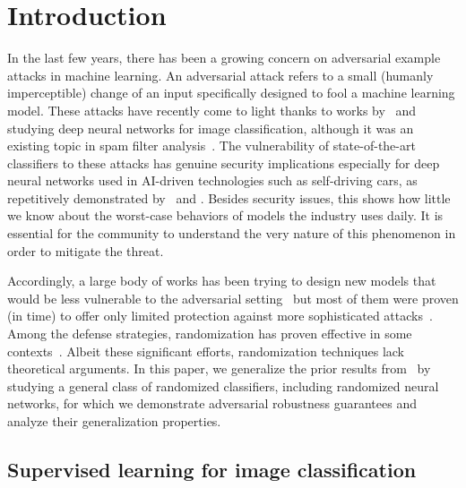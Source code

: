 \section{Introduction}
\label{section::Introduction}
In the last few years, there has been a growing concern on adversarial example attacks in machine learning. An adversarial attack refers to a small (humanly imperceptible) change of an input specifically designed to fool a machine learning model. These attacks have recently come to light thanks to works by~\cite{biggio2013evasion} and~\cite{Szegedy2013IntriguingPO} studying deep neural networks for image classification, although it was an existing topic in spam filter analysis~\citep{dalvi2004adversarial,lowd2005adversarial,globerson2006nightmare}.
The vulnerability of state-of-the-art classifiers to these attacks has genuine security implications especially for deep neural networks used in AI-driven technologies such as self-driving cars, as repetitively demonstrated by~\cite{sharif2016accessorize,sitawarin2018darts} and \cite{selfdrivingattack2020}. Besides security issues, this shows how little we know about the worst-case behaviors of models the industry uses daily. It is essential for the community to understand the very nature of this phenomenon in order to mitigate the threat.

Accordingly, a large body of works has been trying to design new models that would be less vulnerable to the adversarial setting~\citep{goodfellow2014explaining,metzen2017detecting,Xie2017MitigatingAE,hu2019new,NIPS2019_9070} but most of them were proven (in time) to offer only limited protection against more sophisticated attacks~\citep{carlini2017adversarial,he2017adversarial,obfuscated-gradients,croce2020reliable,tramer2020adaptive}. Among the defense strategies, randomization has proven effective in some contexts~\citep{Xie2017MitigatingAE,pruningDefenseICLR2018,Xuang2018,rakin2018parametricnoiseinjection}. Albeit these significant efforts, randomization techniques lack theoretical arguments. In this paper, we generalize the prior results from~\cite{pinot2019theoretical} by studying a general class of randomized classifiers, including randomized neural networks, for which we demonstrate adversarial robustness guarantees and analyze their generalization properties.

\subsection{Supervised learning for image classification} 

